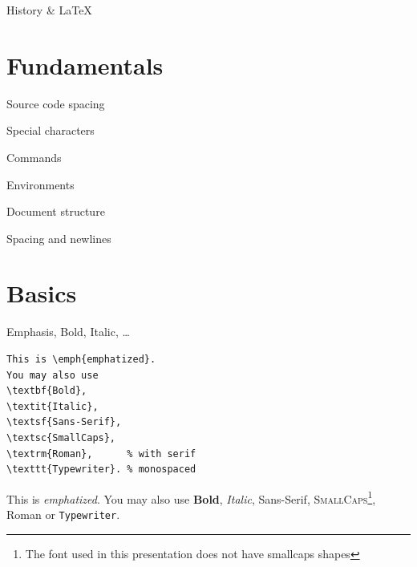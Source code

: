 \documentclass[xetex, onlymath]{beamer}
\begin{document}
\begin{frame}{History \& \textrm{\LaTeX}}
\end{frame}

\section{Fundamentals}
\begin{frame}{Source code spacing}
\end{frame}

\begin{frame}{Special characters}
\end{frame}

\begin{frame}{Commands}
\end{frame}

\begin{frame}{Environments}
\end{frame}

\begin{frame}{Document structure}
\end{frame}

\begin{frame}{Spacing and newlines}
\end{frame}

\section{Basics}
\begin{frame}[fragile]{Emphasis, Bold, Italic, \ldots}
\begin{lstlisting}
This is \emph{emphatized}.
You may also use
\textbf{Bold},
\textit{Italic},
\textsf{Sans-Serif},
\textsc{SmallCaps},
\textrm{Roman},      % with serif
\texttt{Typewriter}. % monospaced
\end{lstlisting}

\begin{exampleblock}{}
This is \emph{emphatized}.
You may also use
\textbf{Bold},
\textit{Italic},
\textsf{Sans-Serif},
\textsc{SmallCaps}\footnote{The font used in this presentation does not have smallcaps shapes},
\textrm{Roman} or
\texttt{Typewriter}.
\end{exampleblock}
\end{frame}
\end{document}
